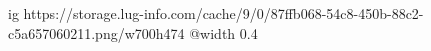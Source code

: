  
 
 
 
 

\ifcmt
  ig https://storage.lug-info.com/cache/9/0/87ffb068-54c8-450b-88c2-c5a657060211.png/w700h474
  @width 0.4
\fi
